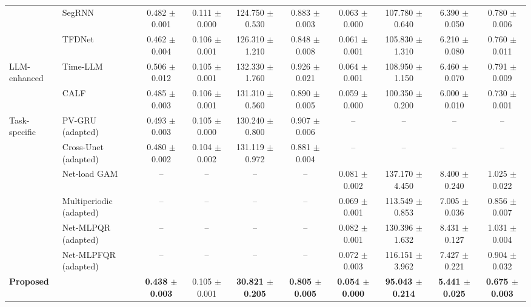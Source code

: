 \documentclass[journal]{IEEEtran}
\begin{document}
\begin{table}[tp]
{\begin{tabular}{llcccccccc}
 & SegRNN & 0.482 $\pm$ 0.001 & 0.111 $\pm$ 0.000 & 124.750 $\pm$ 0.530 & 0.883 $\pm$ 0.003 & 0.063 $\pm$ 0.000 & 107.780 $\pm$ 0.640 & 6.390 $\pm$ 0.050 & 0.780 $\pm$ 0.006 \\
 & TFDNet & 0.462 $\pm$ 0.004 & 0.106 $\pm$ 0.001 & 126.310 $\pm$ 1.210 & 0.848 $\pm$ 0.008 & 0.061 $\pm$ 0.001 & 105.830 $\pm$ 1.310 & 6.210 $\pm$ 0.080 & 0.760 $\pm$ 0.011 \\
\cmidrule{1-10}
LLM-enhanced & Time-LLM & 0.506 $\pm$ 0.012 & 0.105 $\pm$ 0.001 & 132.330 $\pm$ 1.760 & 0.926 $\pm$ 0.021 & 0.064 $\pm$ 0.001 & 108.950 $\pm$ 1.150 & 6.460 $\pm$ 0.070 & 0.791 $\pm$ 0.009 \\
 & CALF & 0.485 $\pm$ 0.003 & 0.106 $\pm$ 0.001 & 131.310 $\pm$ 0.560 & 0.890 $\pm$ 0.005 & 0.059 $\pm$ 0.000 & 100.350 $\pm$ 0.200 & 6.000 $\pm$ 0.010 & 0.730 $\pm$ 0.001 \\
\cmidrule{1-10}
Task-specific & PV-GRU (adapted) & 0.493 $\pm$ 0.003 & 0.105 $\pm$ 0.000 & 130.240 $\pm$ 0.800 & 0.907 $\pm$ 0.006 & -- & -- & -- & -- \\
 & Cross-Unet (adapted) & 0.480 $\pm$ 0.002 & 0.104 $\pm$ 0.002 & 131.119 $\pm$ 0.972 & 0.881 $\pm$ 0.004 & -- & -- & -- & -- \\
 & Net-load GAM & -- & -- & -- & -- & 0.081 $\pm$ 0.002 & 137.170 $\pm$ 4.450 & 8.400 $\pm$ 0.240 & 1.025 $\pm$ 0.022 \\
 & Multiperiodic (adapted) & -- & -- & -- & -- & 0.069 $\pm$ 0.001 & 113.549 $\pm$ 0.853 & 7.005 $\pm$ 0.036 & 0.856 $\pm$ 0.007 \\
 & Net-MLPQR (adapted) & -- & -- & -- & -- & 0.082 $\pm$ 0.001 & 130.396 $\pm$ 1.632 & 8.431 $\pm$ 0.127 & 1.031 $\pm$ 0.004 \\
 & Net-MLPFQR (adapted) & -- & -- & -- & -- & 0.072 $\pm$ 0.003 & 116.151 $\pm$ 3.962 & 7.427 $\pm$ 0.221 & 0.904 $\pm$ 0.032 \\
\midrule
\multicolumn{2}{l}{\textbf{Proposed}} & \textbf{0.438 $\pm$ 0.003} & 0.105 $\pm$ 0.001 & \textbf{30.821 $\pm$ 0.205} & \textbf{0.805 $\pm$ 0.005} & \textbf{0.054 $\pm$ 0.000} & \textbf{95.043 $\pm$ 0.214} & \textbf{5.441 $\pm$ 0.025} & \textbf{0.675 $\pm$ 0.003} \\
\bottomrule
\end{tabular}%
}
\end{table}
\end{document}
